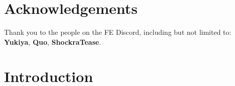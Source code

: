 \documentclass[a4paper]{report}
\begin{document}
\newcommand{\units}[1]{\item Select Units: \begin{itemize} #1 \end{itemize}}
\newcommand{\remove}[1]{\item Remove #1}
\newcommand{\add}[1]{\item Add #1}

\newcommand{\prep}[1]{\newline\newline Preparations: \begin{itemize} #1 \end{itemize}}
\newcommand{\inventory}[1]{\item Inventory: \begin{itemize} #1 \end{itemize}}

\newcommand{\support}[3]{\item Support #1 to #2, Rank #3}

\newcommand{\robinf}{\item \robin:}
\newcommand{\chromf}{\item \chrom:}
\newcommand{\frederickf}{\item \frederick:}
\newcommand{\lucinaf}{\item \lucina:}
\newcommand{\sullyf}{\item \sully:}
\newcommand{\rickenf}{\item \ricken:}
\newcommand{\cordeliaf}{\item \cordelia:}
\newcommand{\nowif}{\item \nowi:}
\newcommand{\oliviaf}{\item \olivia:}
\newcommand{\cherchef}{\item \cherche:}
\newcommand{\sayrif}{\item \sayri:}
\newcommand{\basiliof}{\item \basilio:}
\newcommand{\flaviaf}{\item \flavia:}


\setlength{\columnsep}{.5cm}

\section*{Acknowledgements}

Thank you to the people on the FE Discord, including but not limited to: \textbf{Yukiya}, \textbf{Quo}, \textbf{ShockraTease}.

\section*{Introduction}
\end{document}
